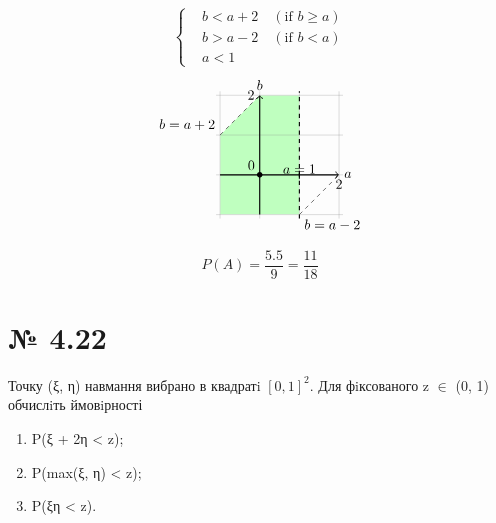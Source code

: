 \begin{multicols}{2}
	$$ \begin{cases}
		& b < a + 2 \quad (\text{if } b \ge a) \\
		& b > a - 2 \quad (\text{if } b < a) \\
		& a < 1
	\end{cases}$$
	\columnbreak
	$$
	\begin{tikzpicture}
		\filldraw[fill=green!25, draw=black!0] (-1,-1) -- (-1,1) -- (0,2) -- (1,2) -- (1,-1) -- cycle;
		\draw[step=1cm,gray,very thin] (-1.1,-1.1) grid (2.1,2.1);
		\draw[thick,->] (-1,0) -- (2,0) node[anchor=west] {$a$} node[below] {$2$};
		\fill (0,0) circle (2pt) node[above left] {$0$};
		\draw[thick,->] (0,-1) -- (0,2) node[anchor=south] {$b$} node[left] {$2$};
		\draw[thick,dashed] (1, -1.1) -- (1, 2.1);
		\draw[thick] (1, 0.1) -- (1, -0.1) node[anchor=south] {$a = 1$};
		\draw[dashed] (-1,1) node[anchor=south east] {$b = a+2$}-- (0, 2);
		\draw[dashed] (1,-1) node[anchor=north west] {$b = a-2$} -- (2, 0);
	\end{tikzpicture}
	$$
\end{multicols}

\begin{mdframed}[style=ans]
	$$P(A) = \frac{5.5}{9} = \frac{11}{18}$$
\end{mdframed}


\section*{№ 4.22}
\begin{mdframed}
	Точку (ξ, η) навмання вибрано в квадратi $[0, 1]^2$. 
	Для фiксованого z $\in$ (0, 1) обчислiть ймовiрності
	\begin{enumerate}
		\item P(ξ + 2η < z);
		\item P(max(ξ, η) < z);
		\item P(ξη < z).
	\end{enumerate}
\end{mdframed}

